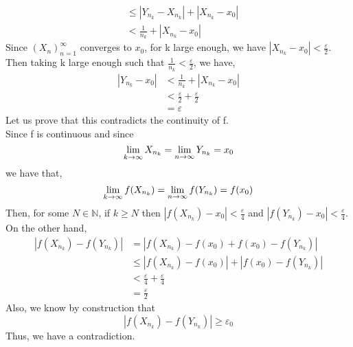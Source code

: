 \documentclass[12pt]{article}
\begin{document}
\begin{prf}{}
\begin{align*}
    &\le |Y_{n_k} - X_{n_k}| + |X_{n_k} - x_0|\\
    &< \frac{1}{n_k} + |X_{n_k} - x_0|
\end{align*}
Since \(\left(X_n\right)_{n=1}^\infty\) converges to \(x_0\), for k large enough, we have \(|X_{n_k} - x_0| < \frac{\varepsilon}{2}\).\\
Then taking k large enough such that \(\frac{1}{n_k} < \frac{\varepsilon}{2}\), we have, 
\begin{align*}
    |Y_{n_k} - x_0| &< \frac{1}{n_k} + |X_{n_k} - x_0|\\
    &< \frac{\varepsilon}{2} + \frac{\varepsilon}{2}\\
    &= \varepsilon
\end{align*}
Let us prove that this contradicts the continuity of f.\\
Since f is continuous and since \[\displaystyle\lim_{k\to\infty}X_{n_k} = \displaystyle\lim_{n\to\infty}Y_{n_k} = x_0\]
we have that, 
\[\displaystyle\lim_{k\to\infty}f(X_{n_k}) = \displaystyle\lim_{n\to\infty}f(Y_{n_k}) = f(x_0)\]
Then, for some \(N \in \mathbb N\), if \(k \ge N\) then \(|f(X_{n_k}) - x_0| < \frac{\varepsilon}{4}\) and \(|f(Y_{n_k}) - x_0| < \frac{\varepsilon}{4}\).\\
On the other hand, 
\begin{align*}
    |f(X_{n_k}) - f(Y_{n_k})| &= |f(X_{n_k}) - f(x_0)  + f(x_0) - f(Y_{n_k})|\\
    &\le |f(X_{n_k}) - f(x_0)| + |f(x_0) - f(Y_{n_k})|\\
    &< \frac{\varepsilon}{4} + \frac{\varepsilon}{4}\\
    &= \frac{\varepsilon}{2}
\end{align*}
Also, we know by construction that \[|f(X_{n_k}) - f(Y_{n_k})| \ge \varepsilon_0\]
Thus, we have a contradiction.
\end{prf}

\newpage
\end{document}

